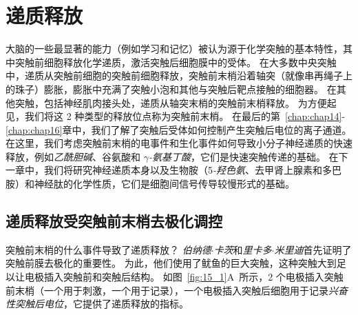 \chapter{递质释放} \label{chap:chap15}

大脑的一些最显著的能力（例如学习和记忆）被认为源于化学突触的基本特性，其中突触前细胞释放化学递质，激活突触后细胞膜中的受体。
在大多数中央突触中，递质从突触前细胞的突触前细胞释放，突触前末梢沿着轴突（就像串再绳子上的珠子）膨胀，膨胀中充满了突触小泡和其他与突触后靶点接触的细胞器。
在其他突触，包括神经肌肉接头处，递质从轴突末梢的突触前末梢释放。
为方便起见，我们将这 2 种类型的释放位点称为突触前末梢。
在最后的第~\ref{chap:chap14}-\ref{chap:chap16}章中，我们了解了突触后受体如何控制产生突触后电位的离子通道。
在这里，我们考虑突触前末梢的电事件和生化事件如何导致小分子神经递质的快速释放，例如\textit{乙酰胆碱}、谷氨酸和 \textit{$\gamma$-氨基丁酸}，它们是快速突触传递的基础。
在下一章中，我们将研究神经递质本身以及生物胺（5\textit{-羟色氨}、去甲肾上腺素和多巴胺）和神经肽的化学性质，它们是细胞间信号传导较慢形式的基础。



\section{递质释放受突触前末梢去极化调控}

突触前末梢的什么事件导致了递质释放？
\textit{伯纳德$\cdot$卡茨}和\textit{里卡多$\cdot$米里迪}首先证明了突触前膜去极化的重要性。
为此，他们使用了鱿鱼的巨大突触，这种突触大到足以让电极插入突触前和突触后结构。
如图~\ref{fig:15_1}A~所示，2 个电极插入突触前末梢（一个用于刺激，一个用于记录），一个电极插入突触后细胞用于记录\textit{兴奋性突触后电位}，它提供了递质释放的指标。


